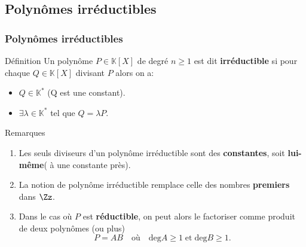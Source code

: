 \documentclass{beamer}
\newcommand{\setK}{\mathbb{K}}
\begin{document}
\subsection{ Polynômes irréductibles}
\begin{frame}[<+->]
  \frametitle{Polynômes irréductibles}
 \begin{block}{Définition}
   \small
   Un polynôme $P\in \setK[X]$ de degré $n\geq 1$ est dit
   \textbf{\alert{irréductible}} si pour chaque $Q\in \setK[X]$ divisant $P$
   alors on a:

   \begin{itemize}
     \item $Q\in \setK^{*}$ (Q est une constant).\\[4pt]
     \item  $\exists \lambda \in \setK^{*}$ tel que $Q = \lambda P$.
   \end{itemize}
 \end{block} 
 \pause

 \begin{block}{Remarques}
   \begin{enumerate}
     \small
     \item Les seuls diviseurs d'un polynôme irréductible sont des
       \textbf{constantes}, soit \textbf{lui-même}( \alert{à une constante
       près}).\\[4pt]
      \item La notion de polynôme irréductible remplace celle des nombres
        \textbf{\alert{premiers}} dans $\Zz$.\\[4pt]
      \item Dans le cas où $P$ est \textbf{\alert{réductible}}, on peut alors le
        factoriser comme produit de deux polynômes (ou plus)
        \begin{equation}
          P = AB\quad \text{où}\quad \text{deg}A\geq 1
          \;\text{et}\;\text{deg}B\geq 1.
        \end{equation}
   \end{enumerate}
 \end{block}
\end{frame}
\end{document}
